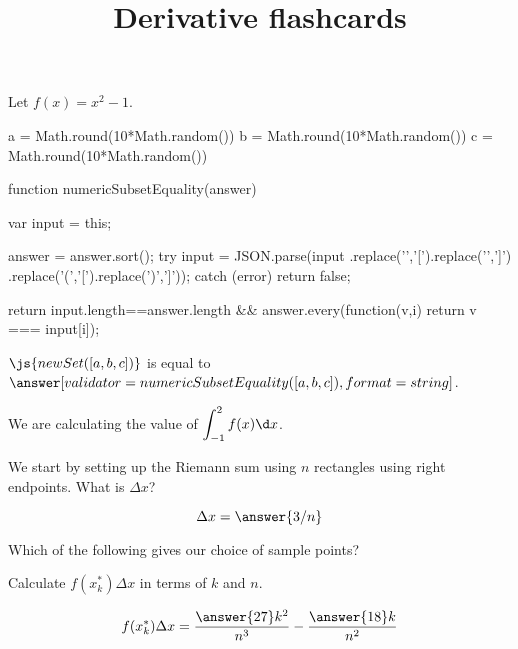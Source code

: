 \documentclass{ximera}
\title{Derivative flashcards}
\begin{document}
\begin{exercise}
Let $f(x) = x^2-1$.

\begin{javascript}
  a = Math.round(10*Math.random())
  b = Math.round(10*Math.random())
  c = Math.round(10*Math.random())  

  function numericSubsetEquality(answer) {
    var input = this;

    answer = answer.sort();
    try {
      input = JSON.parse(input
        .replace('{','[').replace('}',']')
        .replace('(','[').replace(')',']'));
    } catch (error) {
      return false;
    }
    
     return input.length==answer.length &&
       answer.every(function(v,i) { return v === input[i]});
  }
\end{javascript}

\begin{problem}
  $\js{new Set([a,b,c])}$ is equal to $\answer[validator=numericSubsetEquality([a,b,c]),format=string]{}$.
\end{problem}

We are calculating the value of $\displaystyle \int_{-1}^{2} f(x) \d x$.
 

We start by setting up the Riemann sum using $n$ rectangles using right endpoints.
What is $\Delta x$?
     
\[ \Delta x = \answer{3/n} \]

\begin{exercise}
  Which of the following gives our choice of sample points?
  \begin{multipleChoice}
  \end{multipleChoice}
  
  \begin{exercise}
    Calculate $f(x_k^*) \Delta x$ in terms of $k$ and $n$.
    
    \[ f(x_k^*) \Delta x = \frac{\answer{27}k^2}{n^3}-\frac{\answer{18}k}{n^2} \]
  \end{exercise}
\end{exercise}
\end{exercise}
\end{document}
